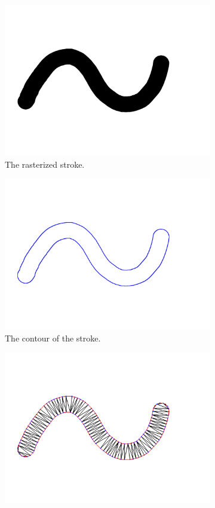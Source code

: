 \documentclass[conference]{acmsiggraph}
\begin{document}
\begin{figure}
\centering
\begin{subfigure}[b]{0.3\textwidth}
  \centering
  \includegraphics[width=.9\textwidth]{images/stroke_triangulation/hardrendered}
  \caption{The rasterized stroke.}
  \label{fig:sub1}
\end{subfigure}%
\begin{subfigure}[b]{0.3\textwidth}
  \centering
  \includegraphics[width=.9\textwidth]{images/stroke_triangulation/hardpruned}
  \caption{The contour of the stroke.}
  \label{fig:sub2}
\end{subfigure}
\begin{subfigure}[b]{0.3\textwidth}
  \centering
  \includegraphics[width=.9\textwidth]{images/stroke_triangulation/hardmesh}

\end{subfigure}
\end{figure}
\end{document}
